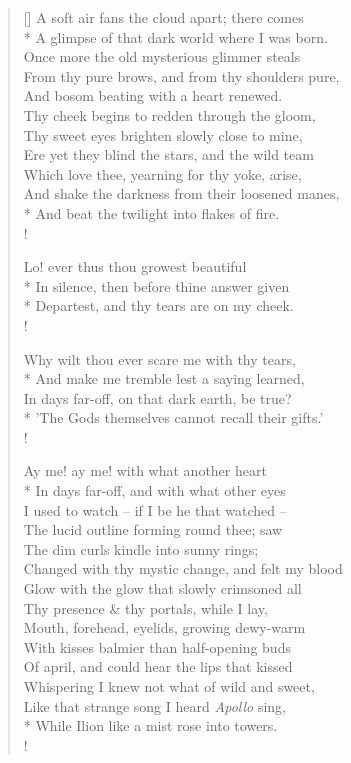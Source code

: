 \documentclass[MAIN]{subfiles}
\begin{document}
\begin{verse}[\versewidth]
A soft air fans the cloud apart; there comes\\*
A glimpse of that dark world where I was born.\\
Once more the old mysterious glimmer steals\\
From thy pure brows, and from thy shoulders pure,\\
And bosom beating with a heart renewed.\\
Thy cheek begins to redden through the gloom,\\
Thy sweet eyes brighten slowly close to mine,\\
Ere yet they blind the stars, and the wild team\\
Which love thee, yearning for thy yoke, arise,\\
And shake the darkness from their loosened manes,\\* 
And beat the twilight into flakes of fire.\\!

Lo! ever thus thou growest beautiful\\*
In silence, then before thine answer given\\*
Departest, and thy tears are on my cheek.\\!

Why wilt thou ever scare me with thy tears,\\*
And make me tremble lest a saying learned,\\
In days far-off, on that dark earth, be true?\\*
'The Gods themselves cannot recall their gifts.'\\!

Ay me! ay me! with what another heart\\*
In days far-off, and with what other eyes\\
I used to watch -- if I be he that watched --\\
The lucid outline forming round thee; saw\\
The dim curls kindle into sunny rings;\\
Changed with thy mystic change, and felt my blood\\
Glow with the glow that slowly crimsoned all\\
Thy presence \& thy portals, while I lay,\\
Mouth, forehead, eyelids, growing dewy-warm\\
With kisses balmier than half-opening buds\\
Of april, and could hear the lips that kissed\\
Whispering I knew not what of wild and sweet,\\
Like that strange song I heard \emph{Apollo} sing,\\*
While {\sc Ilion} like a mist rose into towers.\\!


\end{verse}
\end{document}
